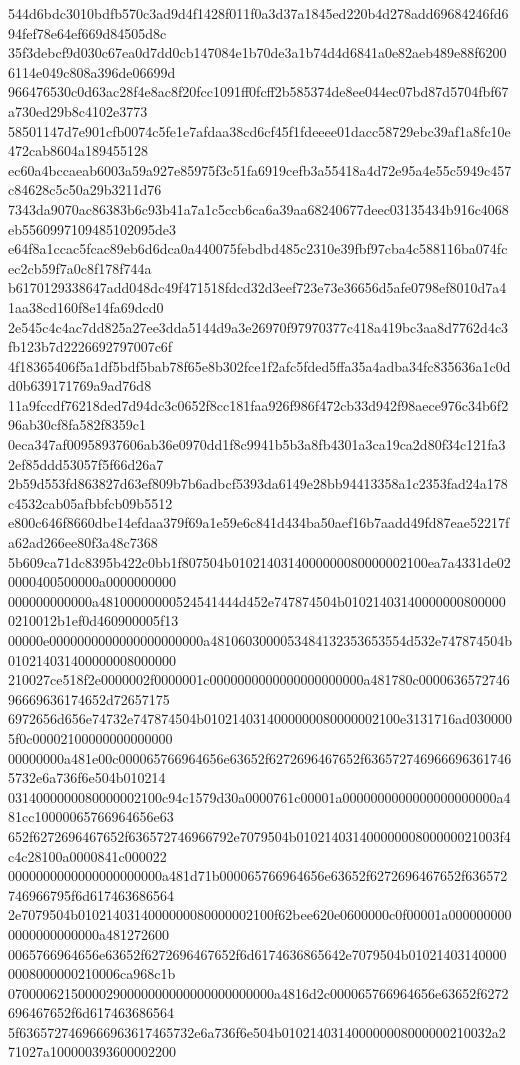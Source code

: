 {544d6bdc3010bdfb570c3ad9d4f1428f011f0a3d37a1845ed220b4d278add69684246fd694fef78e64ef669d84505d8c
35f3debcf9d030c67ea0d7dd0cb147084e1b70de3a1b74d4d6841a0e82aeb489e88f62006114e049c808a396de06699d
966476530c0d63ac28f4e8ac8f20fcc1091ff0fcff2b585374de8ee044ec07bd87d5704fbf67a730ed29b8c4102e3773
58501147d7e901cfb0074c5fe1e7afdaa38cd6cf45f1fdeeee01dacc58729ebc39af1a8fc10e472cab8604a189455128
ec60a4bccaeab6003a59a927e85975f3c51fa6919cefb3a55418a4d72e95a4e55c5949c457c84628c5c50a29b3211d76
7343da9070ac86383b6c93b41a7a1c5ccb6ca6a39aa68240677deec03135434b916c4068eb5560997109485102095de3
e64f8a1ccac5fcac89eb6d6dca0a440075febdbd485c2310e39fbf97cba4c588116ba074fcec2cb59f7a0c8f178f744a
b6170129338647add048dc49f471518fdcd32d3eef723e73e36656d5afe0798ef8010d7a41aa38cd160f8e14fa69dcd0
2e545c4c4ac7dd825a27ee3dda5144d9a3e26970f97970377c418a419bc3aa8d7762d4c3fb123b7d2226692797007c6f
4f18365406f5a1df5bdf5bab78f65e8b302fce1f2afc5fded5ffa35a4adba34fc835636a1c0dd0b639171769a9ad76d8
11a9fccdf76218ded7d94dc3c0652f8cc181faa926f986f472cb33d942f98aece976c34b6f296ab30cf8fa582f8359c1
0eca347af00958937606ab36e0970dd1f8c9941b5b3a8fb4301a3ca19ca2d80f34c121fa32ef85ddd53057f5f66d26a7
2b59d553fd863827d63ef809b7b6adbcf5393da6149e28bb94413358a1c2353fad24a178c4532cab05afbbfcb09b5512
e800c646f8660dbe14efdaa379f69a1e59e6c841d434ba50aef16b7aadd49fd87eae52217fa62ad266ee80f3a48c7368
5b609ca71dc8395b422c0bb1f807504b0102140314000000080000002100ea7a4331de020000400500000a0000000000
000000000000a48100000000524541444d452e747874504b010214031400000008000000210012b1ef0d460900005f13
00000e0000000000000000000000a4810603000053484132353653554d532e747874504b010214031400000008000000
210027ce518f2e0000002f0000001c0000000000000000000000a481780c000063657274696669636174652d72657175
6972656d656e74732e747874504b0102140314000000080000002100e3131716ad0300005f0c00002100000000000000
00000000a481e00c000065766964656e63652f6272696467652f6365727469666963617465732e6a736f6e504b010214
0314000000080000002100c94c1579d30a0000761c00001a0000000000000000000000a481cc10000065766964656e63
652f6272696467652f636572746966792e7079504b01021403140000000800000021003f4c4c28100a0000841c000022
0000000000000000000000a481d71b000065766964656e63652f6272696467652f636572746966795f6d617463686564
2e7079504b0102140314000000080000002100f62bee620e0600000c0f00001a0000000000000000000000a481272600
0065766964656e63652f6272696467652f6d6174636865642e7079504b010214031400000008000000210006ca968c1b
07000062150000290000000000000000000000a4816d2c000065766964656e63652f6272696467652f6d617463686564
5f6365727469666963617465732e6a736f6e504b010214031400000008000000210032a271027a100000393600002200
}
